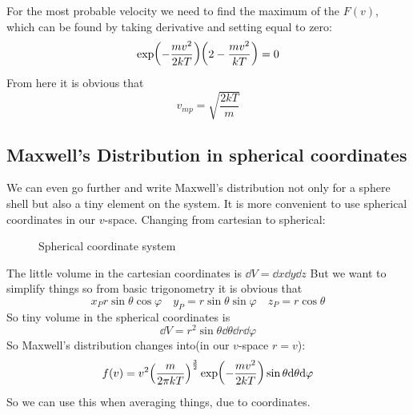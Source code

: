 \documentclass[a4paper, 12pt]{article}
\begin{document}
For the most probable velocity we need to find the maximum of the $F(v)$, which can be found by taking derivative and setting equal to zero:
$$\exp(-\frac{mv^2}{2kT})\qty(2-\frac{mv^2}{kT})=0$$ From here it is obvious that $$v_{mp}=\sqrt{\frac{2kT}{m}}$$

\newpage
\subsection{Maxwell's Distribution in spherical coordinates}
We can even go further and write Maxwell's distribution not only for a sphere shell but also a tiny element on the system. It is more convenient to use 
spherical coordinates in our $v$-space. Changing from cartesian to spherical:
%
%
\begin{figure}[h!]
    \centering
    \caption{Spherical coordinate system}
\end{figure}

The little volume in the cartesian coordinates is $\dd V=\dd x\dd y\dd z$ But we want to simplify things so from basic
trigonometry it is obvious that $$x_P r\sin\theta\cos\varphi\quad y_P=r\sin\theta\sin\varphi\quad z_P=r\cos\theta$$ 
So tiny volume in the spherical coordinates is $$\dd V=r^2\sin\theta\dd\theta\dd r\dd\varphi$$
So Maxwell's distribution changes into(in our $v$-space $r=v$):
$$f(v)=v^2\qty(\frac{m}{2\pi kT})^{\frac{3}{2}}\exp(-\frac{mv^2}{2kT})\sin\theta\dd\theta\dd\varphi$$
So we can use this when averaging things, due to coordinates.
\newpage
\end{document}
